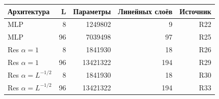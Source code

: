 \begin{tabular}{lrrrr}
\toprule
Архитектура & L & Параметры & Линейных слоёв & Источник \\
\midrule
MLP & 8 & 1249802 & 9 & R22 \\
MLP & 96 & 7039498 & 97 & R25 \\
Res $\alpha=1$ & 8 & 1841930 & 18 & R26 \\
Res $\alpha=1$ & 96 & 13421322 & 194 & R29 \\
Res $\alpha=L^{-1/2}$ & 8 & 1841930 & 18 & R30 \\
Res $\alpha=L^{-1/2}$ & 96 & 13421322 & 194 & R33 \\
\bottomrule
\end{tabular}